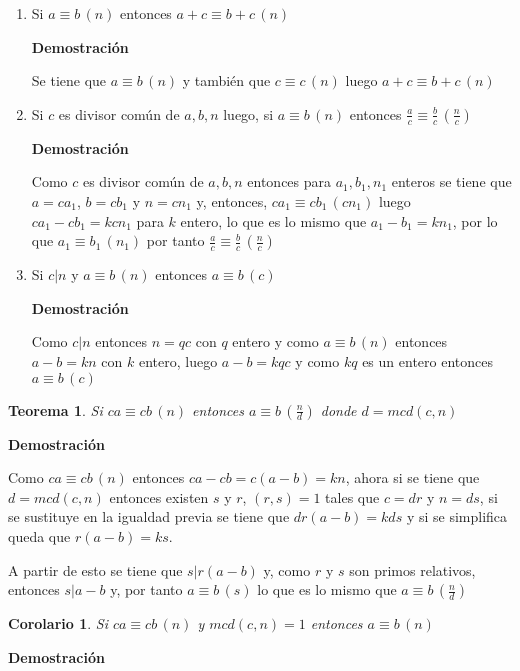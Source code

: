 \documentclass[a4paper,12pt]{report}
\newtheorem*{teo}{Teorema}
\newtheorem*{cor}{Corolario}
\begin{document}
\begin{enumerate}
 \item Si $a \equiv b \, (n)$ entonces $a+c \equiv b+c \, (n)$
 
 \textbf{Demostración}
 
Se tiene que $a \equiv b \, (n)$ y también que $c \equiv c \, (n)$ luego $a+c \equiv b+c \, (n)$

 
 \item Si $c$ es divisor común de $a,b,n$ luego, si $a \equiv b \, (n)$ entonces $\frac{a}{c} \equiv \frac{b}{c} \, (\frac{n}{c})$
 
\textbf{Demostración}
 
 Como $c$ es divisor común de $a,b,n$ entonces para $a_1,b_1,n_1$ enteros se tiene que $a=ca_1$, $b=cb_1$ y $n=cn_1$ y, entonces, $ca_1 \equiv cb_1 \, (cn_1)$ luego $ca_1-cb_1=kcn_1$ para $k$ entero, lo que es lo mismo que $a_1-b_1=kn_1$, por lo que $a_1 \equiv b_1 \, (n_1)$ por tanto $\frac{a}{c} \equiv \frac{b}{c} \, (\frac{n}{c})$
 
 \item Si $c|n$ y $a \equiv b \, (n)$ entonces $a \equiv b \, (c)$

 \textbf{Demostración}
 
 Como $c|n$ entonces $n=qc$ con $q$ entero y como $a \equiv b \, (n)$ entonces $a-b=kn$ con $k$ entero, luego $a-b=kqc$ y como $kq$ es un entero entonces $a \equiv b \, (c)$
 
 
\end{enumerate}


\begin{teo}
 Si $ca \equiv cb \, (n)$ entonces $a \equiv b \, (\frac{n}{d})$ donde $d=mcd(c,n)$ 
\end{teo}

\textbf{Demostración}

Como $ca \equiv cb \, (n)$ entonces $ca-cb=c(a-b)=kn$, ahora si se tiene que $d=mcd(c,n)$  
entonces existen $s$ y $r$, $(r,s)=1$ tales que $c=dr$ y $n=ds$, si se sustituye en la igualdad previa se tiene que $dr(a-b)=kds$ y si se simplifica queda que $r(a-b)=ks$. 

A partir de esto se tiene que $s|r(a-b)$ y, como $r$ y $s$ son primos relativos, entonces  $s|a-b$ y, por tanto $a\equiv b \, (s)$ lo que es lo mismo que $a\equiv b \, (\frac{n}{d})$


\begin{cor}
 Si $ca \equiv cb \, (n)$ y $mcd(c,n)=1$ entonces $a \equiv b \, (n)$
\end{cor}

\textbf{Demostración}
\end{document}
